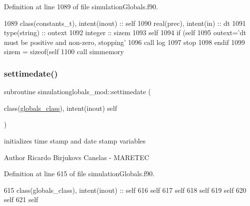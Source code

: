 Definition at line 1089 of file simulation\+Globals.\+f90.


\begin{DoxyCode}
1089     \textcolor{keywordtype}{class}(constants\_t), \textcolor{keywordtype}{intent(inout)} :: self
1090     \textcolor{keywordtype}{real(prec)}, \textcolor{keywordtype}{intent(in)} :: dt
1091     \textcolor{keywordtype}{type}(string) :: outext
1092     \textcolor{keywordtype}{integer} :: sizem
1093     self%
1094     \textcolor{keywordflow}{if} (self%
1095         outext=\textcolor{stringliteral}{'dt must be positive and non-zero, stopping'}
1096         \textcolor{keyword}{call }log%
1097         stop
1098 \textcolor{keywordflow}{    endif}
1099     sizem = sizeof(self%
1100     \textcolor{keyword}{call }simmemory%
\end{DoxyCode}
\mbox{\label{namespacesimulationglobals__mod_aefda4344f03a705055ad6cb97cb90c65}} 
\subsubsection{\texorpdfstring{settimedate()}{settimedate()}}
{\footnotesize\ttfamily subroutine simulationglobals\+\_\+mod\+::settimedate (\begin{DoxyParamCaption}\item[{class(\mbox{\hyperlink{structsimulationglobals__mod_1_1globals__class}{globals\+\_\+class}}), intent(inout)}]{self }\end{DoxyParamCaption})\hspace{0.3cm}{\ttfamily [private]}}



initializes time stamp and date stamp variables 

\begin{DoxyAuthor}{Author}
Ricardo Birjukovs Canelas -\/ M\+A\+R\+E\+T\+EC 
\end{DoxyAuthor}


Definition at line 615 of file simulation\+Globals.\+f90.


\begin{DoxyCode}
615     \textcolor{keywordtype}{class}(globals\_class), \textcolor{keywordtype}{intent(inout)} :: self
616     self%
617     self%
618     self%
619     self%
620     self%
621     self%
\end{DoxyCode}
\mbox{\label{namespacesimulationglobals__mod_a2c6fa0a9123d06b2110258ea200f4f52}} 
